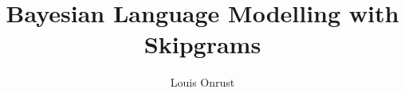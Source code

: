 \documentclass{beamer}
\author{Louis Onrust}
\title{Bayesian Language Modelling with Skipgrams}
\date{}
\begin{document}
\begin{frame}
	\titlepage
\end{frame}

\begin{frame}
\end{frame}
\end{document}

